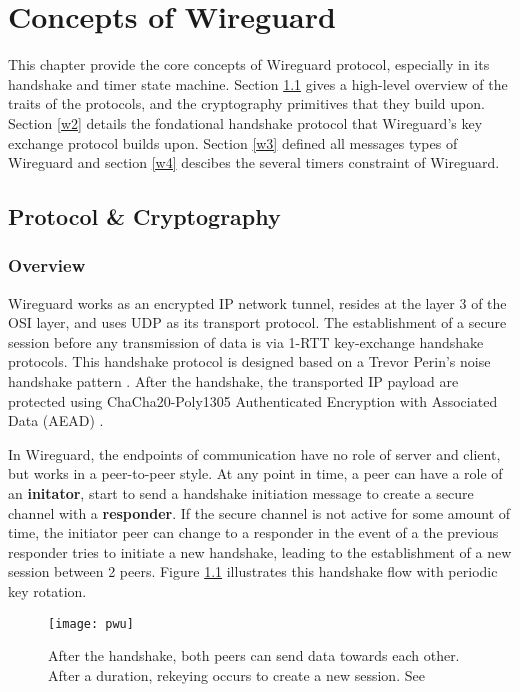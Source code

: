 \chapter{Concepts of Wireguard}
  This chapter provide the core concepts of Wireguard protocol, especially in its handshake
  and timer state machine. Section \ref{w1} gives a high-level overview of the traits of the
  protocols, and the cryptography primitives that they build upon. 
  Section \ref{w2}  details the fondational handshake protocol that Wireguard's
  key exchange protocol builds upon. Section \ref{w3} defined all messages types of Wireguard and
  section \ref{w4} descibes the several timers constraint of Wireguard.
\section{Protocol \& Cryptography} \label{w1}
\subsection{Overview}
 Wireguard works as an encrypted IP network tunnel, resides at the layer 3 of the OSI layer, and
 uses UDP as its transport protocol. The establishment of a secure session before any 
 transmission of data is via 1-RTT key-exchange handshake protocols. This handshake protocol
 is designed based on a Trevor Perin's noise handshake pattern \cite{noise}. After the handshake, the  
 transported IP payload are protected using ChaCha20-Poly1305 Authenticated Encryption with 
 Associated Data (AEAD) \cite{rfc8439}.

 In Wireguard, the endpoints of communication have no role of server and client, but works in a
 peer-to-peer style. At any point in time, a peer can have a role of an \textbf{initator}, start to send 
 a handshake initiation message to create a secure channel with a \textbf{responder}. If the secure channel
 is not active for some amount of time, the initiator peer can change to a responder in the event of
 a the previous responder tries to initiate a new handshake, leading to the establishment of a new session
 between 2 peers. Figure \ref{fig:pwu_hs} illustrates this handshake flow with periodic key rotation.

\begin{figure}[h]
  \centering
  \texttt{[image: pwu]}
  \caption{After the handshake, both peers can send data towards each other. After a duration, rekeying occurs to create a new session. See \cite[p.~7]{pwu}}
  \label{fig:pwu_hs}
\end{figure}

